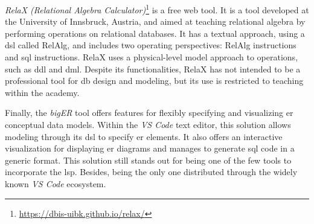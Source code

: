 \textit{RelaX (Relational Algebra Calculator)}\footnote{\url{https://dbis-uibk.github.io/relax/}} is a free web tool. 
It is a tool developed at the University of Innsbruck, Austria, and aimed at teaching relational algebra by performing operations on relational databases.
It has a textual approach, using a \ac{dsl} called RelAlg, and includes two operating perspectives: RelAlg instructions and \ac{sql} instructions.
RelaX uses a physical-level model approach to operations, such as \ac{ddl} and \ac{dml}.
Despite its functionalities, RelaX has not intended to be a professional tool for \ac{db} design and modeling, but its use is restricted to teaching within the academy.

Finally, the \textit{bigER} tool offers features for flexibly specifying and visualizing \ac{er} conceptual data models. 
Within the \textit{VS Code} text editor, this solution allows modeling through its \ac{dsl} to specify \ac{er} elements.
It also offers an interactive visualization for displaying \ac{er} diagrams and manages to generate \ac{sql} code in a generic format.
This solution still stands out for being one of the few tools to incorporate the \ac{lsp}. Besides, being the only one distributed through the widely known \textit{VS Code} ecosystem.


